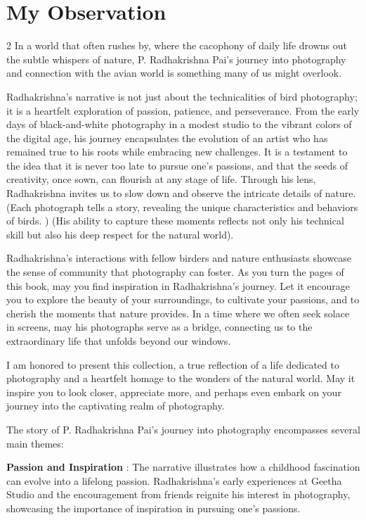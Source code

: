 \documentclass[12pt]{article}
\begin{document}
\section*{My Observation}
\begin{multicols}{2}
\noindent In a world that often rushes by, where the cacophony of daily life drowns out the subtle whispers of nature, P. Radhakrishna Pai's journey into photography and connection with the avian world is something many of us might overlook.

Radhakrishna's narrative is not just about the technicalities of bird photography; it is a heartfelt exploration of passion, patience, and perseverance. From the early days of black-and-white photography in a modest studio to the vibrant colors of the digital age, his journey encapsulates the evolution of an artist who has remained true to his roots while embracing new challenges. It is a testament to the idea that it is never too late to pursue one's passions, and that the seeds of creativity, once sown, can flourish at any stage of life. Through his lens, Radhakrishna invites us to slow down and observe the intricate details of nature. (Each photograph tells a story, revealing the unique characteristics and behaviors of birds. ) (His ability to capture these moments reflects not only his technical skill but also his deep respect for the natural world).

Radhakrishna's interactions with fellow birders and nature enthusiasts showcase the sense of community that photography can foster. As you turn the pages of this book, may you find inspiration in Radhakrishna's journey. Let it encourage you to explore the beauty of your surroundings, to cultivate your passions, and to cherish the moments that nature provides. In a time where we often seek solace in screens, may his photographs serve as a bridge, connecting us to the extraordinary life that unfolds beyond our windows.

I am honored to present this collection, a true reflection of a life dedicated to photography and a heartfelt homage to the wonders of the natural world. May it inspire you to look closer, appreciate more, and perhaps even embark on your journey into the captivating realm of photography.

The story of P. Radhakrishna Pai's journey into photography encompasses several main themes:

\textbf{Passion and Inspiration} : The narrative illustrates how a childhood fascination can evolve into a lifelong passion. Radhakrishna's early experiences at Geetha Studio and the encouragement from friends reignite his interest in photography, showcasing the importance of inspiration in pursuing one's passions.


\end{multicols}
\end{document}
